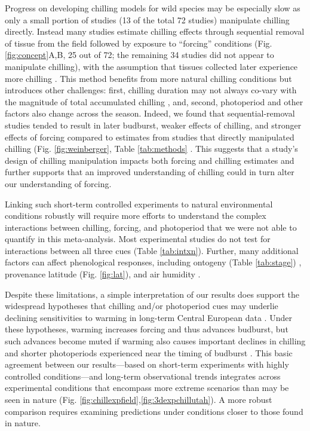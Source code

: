 \documentclass{article}
\newcommand{\R}[1]{\label{#1}\linelabel{#1}}
\begin{document}
\par Progress on developing chilling models for wild species may be especially slow as only a small portion of studies (13 of the total 72 studies) manipulate chilling directly. Instead many studies estimate chilling effects through sequential removal of tissue from the field followed by exposure to ``forcing'' conditions (Fig. \ref{fig:concept}A,B, 25 out of 72; the remaining 34 studies did not appear to manipulate chilling), with the assumption that tissues collected later experience more chilling \emph{\citep{weinberger1950}}. This method benefits from more natural chilling conditions but introduces other challenges: first, chilling duration may not always co-vary with the magnitude of total accumulated chilling \emph{\citep{dennis2003}}, and, second, photoperiod and other factors also change across the season. Indeed, we found that sequential-removal studies tended to result in later budburst, weaker effects of chilling, and stronger effects of forcing compared to estimates from studies that directly manipulated chilling (Fig. \ref{fig:weinberger}, Table \ref{tab:methods} \emph{\citep{weinberger1950,polgar2013}}. This suggests that a study's design of chilling manipulation impacts both forcing and chilling estimates and further supports that an improved understanding of chilling could in turn alter our understanding of forcing. 

\par Linking such short-term controlled experiments to natural environmental conditions robustly will require more efforts to understand the complex interactions between chilling, forcing, and photoperiod that we were not able to quantify in this meta-analysis. Most experimental studies do not test for interactions between all three cues (Table \ref{tab:intxn}). Further, many additional factors can affect phenological responses, including ontogeny (Table \ref{tab:stage}) \emph{\citep[][]{vitasse2013ont}}, provenance latitude (Fig. \ref{fig:lat}), and air humidity \emph{\citep{Laube:2014b}}. 

\par Despite these limitations, a simple interpretation of our results does support the widespread hypotheses that chilling and/or photoperiod cues may underlie declining sensitivities to warming in long-term Central European data \emph{\citep{fu2015,Rutishauser:2008,yu2010}}. Under these hypotheses, warming increases forcing and thus advances budburst, but such advances become muted if warming also causes important declines in chilling and shorter photoperiods experienced near the timing of budburst \emph{\citep{gauzere2019}}. This basic agreement between our results---based on short-term \R{ee8}experiments with highly controlled conditions---and long-term observational trends integrates across experimental conditions that encompass more extreme scenarios than may be seen in nature (Fig. \ref{fig:chillexpfield},\ref{fig:3dexpchillutah}). A more robust comparison requires examining predictions under conditions closer to those found in nature.
\end{document}
